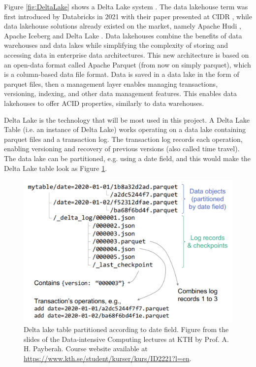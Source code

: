 Figure \ref{fig:DeltaLake} shows a Delta Lake system \cite{armbrustDeltaLakeHighperformance2020}. The data lakehouse term was first introduced by Databricks in 2021 with their paper presented at \gls{CIDR} \cite{lakehouse2021}, while data lakehouse solutions already existed on the market, namely Apache Hudi \cite{rajaperumalUberEngineeringIncremental2017}, Apache Iceberg and Delta Lake \cite{armbrustDeltaLakeHighperformance2020}. Data lakehouses combine the benefits of data warehouses and data lakes while simplifying the complexity of storing and accessing data in enterprise data architectures. This new architecture is based on an open-data format called Apache Parquet (from now on simply parquet), which is a column-based data file format. Data is saved in a data lake in the form of parquet files, then a management layer enables managing transactions, versioning, indexing, and other data management features. This enables data lakehouses to offer \gls{ACID} properties, similarly to data warehouses. 

Delta Lake is the technology that will be most used in this project. A Delta Lake Table (i.e. an instance of Delta Lake) works operating on a data lake containing parquet files and a transaction log. The transaction log records each operation, enabling versioning and recovery of previous versions (also called time travel). The data lake can be partitioned, e.g. using a date field, and this would make the Delta Lake table look as Figure \ref{fig:delta_table}. 

\begin{figure}
    \begin{center}
      \includegraphics[width=\textwidth]{figures/2-background/delta_lake_table.png}
    \end{center}
    \caption[Delta lake partitioning]{Delta lake table partitioned according to date field. Figure from the slides of the Data-intensive Computing lectures at KTH by Prof. A. H. Payberah. Course website available at \url{https://www.kth.se/student/kurser/kurs/ID2221?l=en}.}
    \label{fig:delta_table}
\end{figure}

